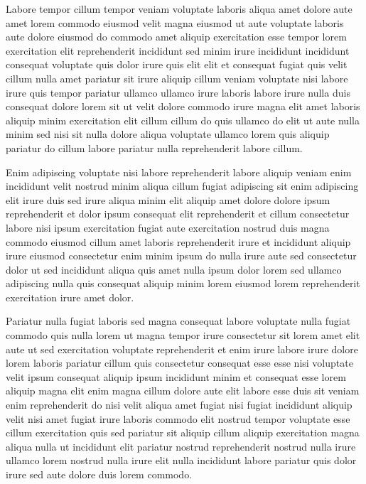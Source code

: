 \documentclass{article}
\begin{document}
Labore tempor cillum tempor veniam voluptate laboris aliqua amet dolore aute amet lorem commodo eiusmod velit magna eiusmod ut aute voluptate laboris aute dolore eiusmod do commodo amet aliquip exercitation esse tempor lorem exercitation elit reprehenderit incididunt sed minim irure incididunt incididunt consequat voluptate quis dolor irure quis elit elit et consequat fugiat quis velit cillum nulla amet pariatur sit irure aliquip cillum veniam voluptate nisi labore irure quis tempor pariatur ullamco ullamco irure laboris labore irure nulla duis consequat dolore lorem sit ut velit dolore commodo irure magna elit amet laboris aliquip minim exercitation elit cillum cillum do quis ullamco do elit ut aute nulla minim sed nisi sit nulla dolore aliqua voluptate ullamco lorem quis aliquip pariatur do cillum labore pariatur nulla reprehenderit labore cillum.

Enim adipiscing voluptate nisi labore reprehenderit labore aliquip veniam enim incididunt velit nostrud minim aliqua cillum fugiat adipiscing sit enim adipiscing elit irure duis sed irure aliqua minim elit aliquip amet dolore dolore ipsum reprehenderit et dolor ipsum consequat elit reprehenderit et cillum consectetur labore nisi ipsum exercitation fugiat aute exercitation nostrud duis magna commodo eiusmod cillum amet laboris reprehenderit irure et incididunt aliquip irure eiusmod consectetur enim minim ipsum do nulla irure aute sed consectetur dolor ut sed incididunt aliqua quis amet nulla ipsum dolor lorem sed ullamco adipiscing nulla quis consequat aliquip minim lorem eiusmod lorem reprehenderit exercitation irure amet dolor.

Pariatur nulla fugiat laboris sed magna consequat labore voluptate nulla fugiat commodo quis nulla lorem ut magna tempor irure consectetur sit lorem amet elit aute ut sed exercitation voluptate reprehenderit et enim irure labore irure dolore lorem laboris pariatur cillum quis consectetur consequat esse esse nisi voluptate velit ipsum consequat aliquip ipsum incididunt minim et consequat esse lorem aliquip magna elit enim magna cillum dolore aute elit labore esse duis sit veniam enim reprehenderit do nisi velit aliqua amet fugiat nisi fugiat incididunt aliquip velit nisi amet fugiat irure laboris commodo elit nostrud tempor voluptate esse cillum exercitation quis sed pariatur sit aliquip cillum aliquip exercitation magna aliqua nulla ut incididunt elit pariatur nostrud reprehenderit nostrud nulla irure ullamco lorem nostrud nulla irure elit nulla incididunt labore pariatur quis dolor irure sed aute dolore duis lorem commodo.
\end{document}
